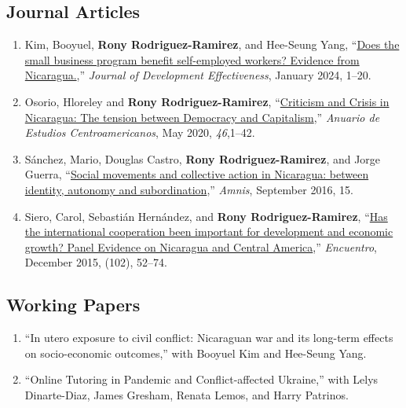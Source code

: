 \documentclass[a4paper, 10pt]{article}
\begin{document}
\subsection*{Journal Articles}

\begin{enumerate}[leftmargin=10pt, label={}, itemindent=-10pt, nosep]
\item Kim, Booyuel, \textbf{Rony Rodriguez-Ramirez}, and Hee-Seung Yang, ``\href{https://www.tandfonline.com/doi/full/10.1080/19439342.2023.2300138}{Does the small business
program benefit self-employed workers? Evidence from Nicaragua.},''
\textit{Journal of Development Effectiveness}, January 2024, 1--20. 
\item Osorio, Hloreley and \textbf{Rony Rodriguez-Ramirez},
``\href{https://revistas.ucr.ac.cr/index.php/anuario/article/view/45081/44860}{Criticism
and Crisis in Nicaragua: The tension between Democracy and Capitalism},'' \emph{Anuario de Estudios Centroamericanos}, May 2020, \textit{46},1--42.
\item Sánchez, Mario, Douglas Castro, \textbf{Rony Rodriguez-Ramirez}, and Jorge
Guerra, ``\href{https://amnis.revues.org/2813}{Social movements and collective
action in Nicaragua: between identity, autonomy and subordination},'' \emph{Amnis}, September 2016, 15.

\item Siero, Carol, Sebastián Hernández, and \textbf{Rony Rodriguez-Ramirez},
``\href{http://www.uca.edu.ni/2/images/Revista-Encuentro/Revistas/e102/art-5.pdf}{Has
the international cooperation been important for development and economic
growth? Panel Evidence on Nicaragua and Central America},''
\emph{Encuentro}, December 2015, (102), 52--74.
\end{enumerate}

\subsection*{Working Papers}

\begin{enumerate}[leftmargin=10pt, label={}, itemindent=-10pt, nosep]
\item ``In utero exposure to civil conflict: Nicaraguan war and its long-term
effects on socio-economic outcomes,'' with Booyuel Kim and Hee-Seung Yang.
\item ``Online Tutoring in Pandemic and Conflict-affected Ukraine,'' with Lelys
Dinarte-Diaz, James Gresham, Renata Lemos, and Harry Patrinos. 
\end{enumerate}
\end{document}
